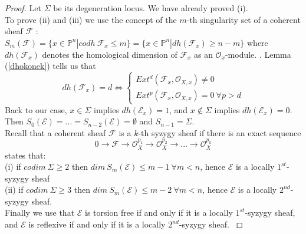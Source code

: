 \documentclass[
	oldfontcommands,
	sumario=abnt-6027-2012,
	12pt,			%
	openright,		%
	oneside,		%
	a4paper,		%
	english,		%
	brazil			%
	]{imecc-unicamp}
\begin{document}
\begin{proof}
Let $\Sigma$ be its degeneration locus.
We have already proved (i). \\
To prove (ii) and (iii) we use the concept of the $m$-th singularity set of a coherent sheaf $\mathcal{F}$ : \\
$S_m (\mathcal{F}) = \{ x \in \mathbb{P}^n | codh \ \mathcal{F}_x \leq m \} = \{ x \in \mathbb{P}^n | dh(\mathcal{F}_x) \geq n-m \} $ where $dh(\mathcal{F}_x)$ denotes the homological dimension of $\mathcal{F}_x$ as an $\mathcal{O}_x$-module. \cite[Okonek, Schneider \& Spindler, Lemma 1.1.3]{Okonek}. Lemma (\ref{dhokonek})  tells us that
\begin{equation}
dh(\mathcal{F}_x)=d \iff \begin{cases} Ext^d (\mathcal{F}_x, \mathcal{O}_{X,x}) \not= 0 \\ Ext^p(\mathcal{F}_x,\mathcal{O}_{X,x})=0 \ \forall p >d \end{cases} 
\end{equation}
Back to our case, $x \in \Sigma$ implies $dh(\mathcal{E}_x)=1$, and $x \not \in \Sigma$ implies $dh(\mathcal{E}_x)=0$. Then $S_0(\mathcal{E}) = ... = S_{n-2}(\mathcal{E}) = \emptyset$ and $S_{n-1}=\Sigma$.\\
Recall that a coherent sheaf $\mathcal{F}$ is a $k$-th syzygy sheaf if there is an exact sequence
\begin{equation}
0 \to \mathcal{F} \to \mathcal{O}_X^{p_1} \to \mathcal{O}_X^{p_2} \to ... \to \mathcal{O}_X^{p_k}
\end{equation}
\cite[Siu, Proposition 1.20]{Siu} states that:\\
(i) if $codim \ \Sigma \geq 2$ then $dim \ S_m(\mathcal{E}) \leq m-1 \ \forall m<n$, hence $\mathcal{E}$ is a locally $1^{st}$-syzygy sheaf \\
(ii) if $codim \ \Sigma \geq3$ then $dim \ S_m(\mathcal{E}) \leq m-2 \ \forall m<n$, hence $\mathcal{E}$ is a locally $2^{nd}$-syzygy sheaf. \\
Finally we use that $\mathcal{E}$ is torsion free if and only if it is a locally $1^{st}$-syzygy sheaf, and $\mathcal{E}$ is reflexive if and only if it is a locally $2^{nd}$-syzygy sheaf. \cite[Okonek, Schneider \& Spindler, p.148-149]{Okonek}
\end{proof}
\end{document}
